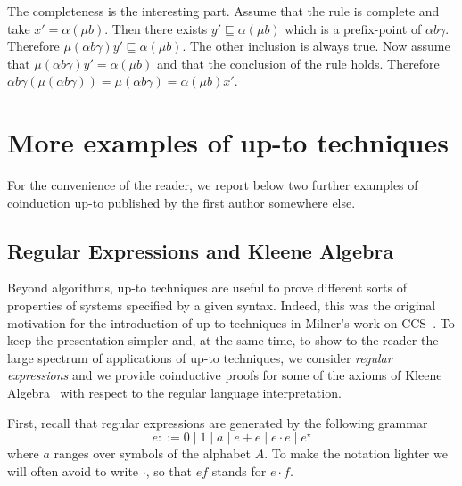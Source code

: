 \documentclass[smallcondensed,envcountsect,envcountsame]{svjour3}     %
\begin{document}
The completeness is the interesting part. Assume that the rule is complete and take $x' = \alpha(\mu b)$. Then there exists $y'\sqsubseteq \alpha(\mu b)$ which is a prefix-point of  $\alpha b \gamma$. Therefore $\mu(\alpha b \gamma) y'\sqsubseteq  \alpha(\mu b)$. The other inclusion is always true.
Now assume that $\mu(\alpha b \gamma) y' =  \alpha(\mu b)$ and that the conclusion of the rule holds. Therefore $ \alpha b \gamma (\mu(\alpha b \gamma))  = \mu(\alpha b \gamma)  =  \alpha(\mu b) x' $.








\clearpage
\appendix
%
%

\section{More examples of up-to techniques}\label{app:moreexample}
%
For the convenience of the reader, we report below two further examples of coinduction up-to published by the first author somewhere else.


\subsection{Regular Expressions and Kleene Algebra}
\label{ssec:KA}
%
Beyond algorithms, up-to techniques are useful to prove different sorts
of properties of systems specified by a given 
syntax. Indeed, this was the original motivation for the introduction
of up-to techniques in Milner's work on CCS~\cite{Milner89}. To keep
the presentation simpler and, at the same time, to show to the reader
the large spectrum of applications of up-to techniques, we consider
\emph{regular expressions} and 
 we provide coinductive proofs for
 some of the axioms of Kleene Algebra~\cite{DBLP:conf/lics/Kozen91} with respect to the
 regular language interpretation.

First, recall that regular expressions are generated by the following
grammar
$$e::=   0 \mid 1 \mid a \mid e+e \mid e\cdot e \mid e^\star$$
where $a$ ranges over symbols of the alphabet $A$. To make the notation
lighter we will often avoid to write $\cdot$, so that $ef$ stands
for $e \cdot f$. 
\end{document}
